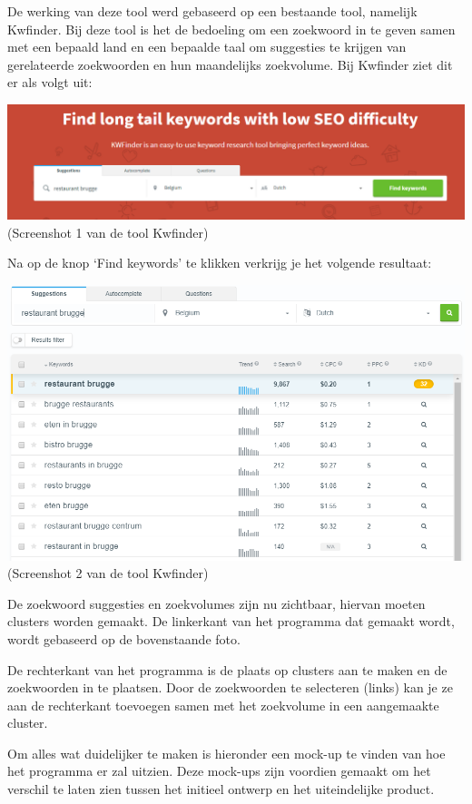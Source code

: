 De werking van deze tool werd gebaseerd op een bestaande tool, namelijk Kwfinder. Bij deze tool is het de bedoeling om een zoekwoord in te geven samen met een bepaald land en een bepaalde taal om suggesties te krijgen van gerelateerde zoekwoorden en hun maandelijks zoekvolume. Bij Kwfinder ziet dit er als volgt uit: 

\includegraphics[width=\linewidth]{Bachelorproef/bachelor/img/kwfindervoorbeeld.png}
(Screenshot 1 van de tool Kwfinder)

Na op de knop ‘Find keywords’ te klikken verkrijg je het volgende resultaat: 

\includegraphics[width=\linewidth]{Bachelorproef/bachelor/img/kwfindervoorbeeld2.png}
(Screenshot 2 van de tool Kwfinder)

De zoekwoord suggesties en zoekvolumes zijn nu zichtbaar, hiervan moeten clusters worden gemaakt. De linkerkant van het programma dat gemaakt wordt, wordt gebaseerd op de bovenstaande foto. 

De rechterkant van het programma is de plaats op clusters aan te maken en de zoekwoorden in te plaatsen. Door de zoekwoorden te selecteren (links) kan je ze aan de rechterkant toevoegen samen met het zoekvolume in een aangemaakte cluster. 

Om alles wat duidelijker te maken is hieronder een mock-up te vinden van hoe het programma er zal uitzien. Deze mock-ups zijn voordien gemaakt om het verschil te laten zien tussen het initieel ontwerp en het uiteindelijke product. 

